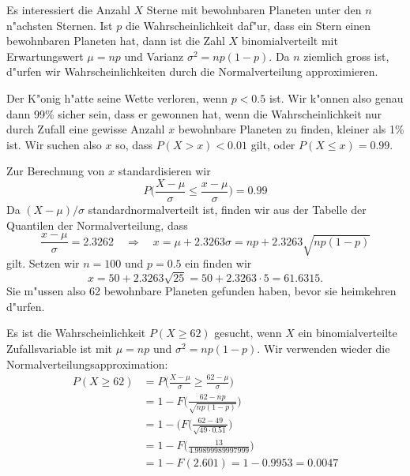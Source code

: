 \begin{loesung}
\begin{teilaufgaben}
\item
Es interessiert die Anzahl $X$ Sterne mit bewohnbaren Planeten
unter den $n$ n"achsten Sternen.
Ist $p$ die  Wahrscheinlichkeit daf"ur, dass ein Stern einen bewohnbaren
Planeten hat, dann ist die Zahl $X$ binomialverteilt mit Erwartungswert
$\mu=np$ und Varianz $\sigma^2=np(1-p)$. Da $n$ ziemlich gross ist, d"urfen wir
Wahrscheinlichkeiten durch die Normalverteilung approximieren.

Der K"onig h"atte seine Wette verloren, wenn $p<0.5$ ist. Wir k"onnen
also genau dann 99\% sicher sein, dass er gewonnen hat, wenn
die Wahrscheinlichkeit nur durch Zufall eine gewisse Anzahl $x$
bewohnbare Planeten zu finden, kleiner als 1\% ist.
Wir suchen also $x$ so, dass $P(X>x)<0.01$ gilt, oder $P(X\le x)=0.99$.

Zur Berechnung von $x$ standardisieren wir
\[
P\biggl(
\frac{X-\mu}{\sigma}\le \frac{x-\mu}{\sigma}
\biggr)
=0.99
\]
Da $(X-\mu)/\sigma$ standardnormalverteilt ist, finden wir aus
der Tabelle der Quantilen der Normalverteilung, dass
\[
\frac{x-\mu}{\sigma}=2.3262
\quad\Rightarrow\quad
x=\mu+2.3263\sigma=np+2.3263\sqrt{np(1-p)}
\]
gilt. Setzen wir $n=100$ und $p=0.5$ ein finden wir
\[
x=50 + 2.3263\sqrt{25}=50 + 2.3263\cdot 5=61.6315.
\]
Sie m"ussen also 62 bewohnbare Planeten gefunden haben, bevor sie heimkehren
d"urfen.

\item Es ist die Wahrscheinlichkeit
$P(X\ge 62)$ gesucht, wenn $X$ ein binomialverteilte Zufallsvariable
ist mit $\mu=np$ und $\sigma^2=np(1-p)$. Wir verwenden wieder die
Normalverteilungsapproximation:
\begin{align*}
P(X\ge 62)
&=
P\biggl(
\frac{X-\mu}{\sigma}\ge \frac{62-\mu}{\sigma}
\biggr)\\
&
=1-F\biggl(
\frac{62-np}{\sqrt{np(1-p)}}
\biggr)
\\
&
=1-\biggl(F(\frac{62-49}{\sqrt{49\cdot 0.51}}\biggr)
\\
&
=
1-F\biggl(\frac{13}{4.99899989997999}\biggr)
\\
&=1-F(2.601)=1-0.9953=0.0047
\end{align*}
\end{teilaufgaben}
\end{loesung}
